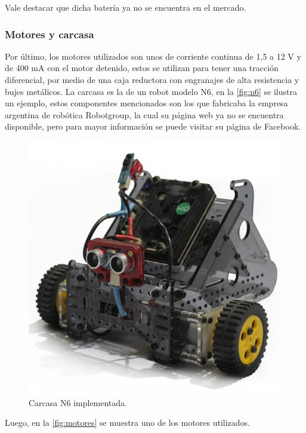\documentclass[11pt,a4paper]{article}
\begin{document}
	Vale destacar que dicha batería ya no se encuentra en el mercado.
	
	\pagebreak
	\subsubsection{Motores y carcasa}
	Por último, los motores utilizados son unos de corriente continua de 1,5 a 12 V y de 400 mA con el motor detenido, estos se utilizan para tener una tracción diferencial, por medio de una caja reductora con engranajes de alta resistencia y bujes metálicos. La carcasa es la de un robot modelo N6, en la \autoref*{fig:n6} se ilustra un ejemplo, estos componentes mencionados son los que fabricaba la empresa argentina de robótica Robotgroup, la cual su página web ya no se encuentra disponible, pero para mayor información se puede visitar su página de Facebook. \cite{robotgroup}
	
	\begin{figure}[h!]
		\centering
		\includegraphics[width=0.45\linewidth]{imagenes/n6.jpg}
		\caption{Carcasa N6 implementada.}
		\label{fig:n6}
	\end{figure}
	
	Luego, en la \autoref*{fig:motores} se muestra uno de los motores utilizados.
	
\end{document}
